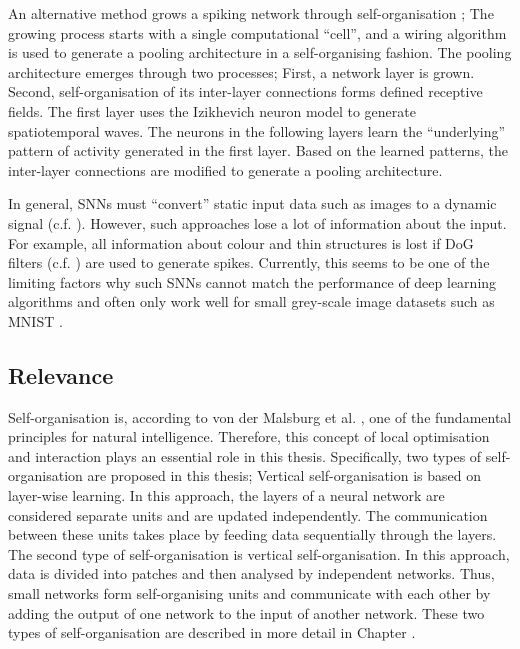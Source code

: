 An alternative method grows a spiking network through self-organisation ; The growing process starts with a single computational ``cell'', and a wiring algorithm is used to generate a pooling architecture in a self-organising fashion.
The pooling architecture emerges through two processes; First, a network layer is grown. Second, self-organisation of its inter-layer connections forms defined receptive fields.
The first layer uses the Izikhevich neuron model  to generate spatiotemporal waves.
The neurons in the following layers learn the ``underlying'' pattern of activity generated in the first layer. 
Based on the learned patterns, the inter-layer connections are modified to generate a pooling architecture.

In general, SNNs must ``convert'' static input data such as images to a dynamic signal (c.f. ). However, such approaches lose a lot of information about the input.
For example, all information about colour and thin structures is lost if DoG filters (c.f. ) are used to generate spikes.
Currently, this seems to be one of the limiting factors why such SNNs cannot match the performance of deep learning algorithms and often only work well for small grey-scale image datasets such as MNIST \cite{Lecun_Bottou_Bengio_Haffner_1998}.

\subsection{Relevance}
Self-organisation is, according to von der Malsburg et al. , one of the fundamental principles for natural intelligence.
Therefore, this concept of local optimisation and interaction plays an essential role in this thesis.
Specifically, two types of self-organisation are proposed in this thesis;
Vertical self-organisation is based on layer-wise learning. In this approach, the layers of a neural network are considered separate units and are updated independently.
The communication between these units takes place by feeding data sequentially through the layers.
The second type of self-organisation is vertical self-organisation. In this approach, data is divided into patches and then analysed by independent networks. Thus, small networks form self-organising units and communicate with each other by adding the output of one network to the input of another network.
These two types of self-organisation are described in more detail in Chapter .


